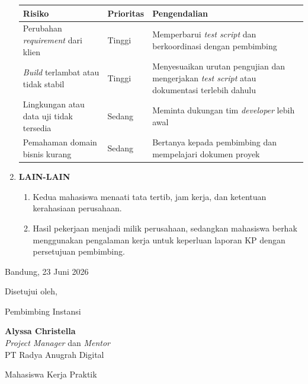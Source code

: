 \begin{framed}
\begin{enumerate}[label=\arabic*.,leftmargin=1.2cm,itemsep=6pt]
\begin{center}
\small
\begin{tabularx}{\linewidth}{|p{3.6cm}|p{1.5cm}|X|}
\hline
\textbf{Risiko} & \textbf{Prioritas} & \textbf{Pengendalian} \\
\hline
Perubahan \textit{requirement} dari klien & Tinggi & Memperbarui \textit{test script} dan berkoordinasi dengan pembimbing \\
\hline
\textit{Build} terlambat atau tidak stabil & Tinggi & Menyesuaikan urutan pengujian dan mengerjakan \textit{test script} atau dokumentasi terlebih dahulu \\
\hline
Lingkungan atau data uji tidak tersedia & Sedang & Meminta dukungan tim \textit{developer} lebih awal \\
\hline
Pemahaman domain bisnis kurang & Sedang & Bertanya kepada pembimbing dan mempelajari dokumen proyek \\
\hline
\end{tabularx}
\end{center}

\item \textbf{LAIN-LAIN}

\begin{enumerate}[label=\arabic*)]
\item Kedua mahasiswa menaati tata tertib, jam kerja, dan ketentuan kerahasiaan perusahaan.
\item Hasil pekerjaan menjadi milik perusahaan, sedangkan mahasiswa berhak menggunakan pengalaman kerja untuk keperluan laporan KP dengan persetujuan pembimbing.
\end{enumerate}
\end{enumerate}

\vspace{0.6cm}
\begin{center}
Bandung, 23 Juni 2026

\vspace{0.3cm}
Disetujui oleh,

\vspace{0.4cm}
Pembimbing Instansi

\vspace{1.6cm}
\textbf{Alyssa Christella}\\
\textit{Project Manager} dan \textit{Mentor}\\
PT Radya Anugrah Digital

\vspace{0.6cm}
Mahasiswa Kerja Praktik


\end{center}
\end{framed}
